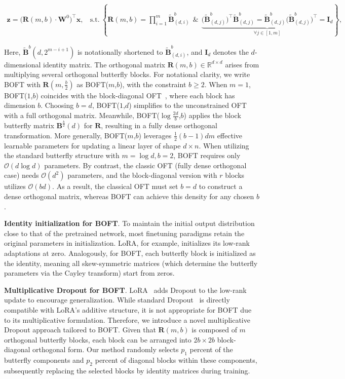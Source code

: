 \begin{equation}
    \begin{aligned}\nonumber
    \bm{z}=\big(\bm{R}(m,b)\cdot\bm{W}^0\big)^\top\bm{x},~~~~\text{s.t.}~\left\{\bm{R}(m,b)=\prod_{i=1}^m \tilde{\bm{B}}^b_{(d,i)}~~\&~~\underbrace{\big(\tilde{\bm{B}}^b_{(d,j)}\big)^\top\tilde{\bm{B}}^b_{(d,j)}=\tilde{\bm{B}}^b_{(d,j)}\big(\tilde{\bm{B}}^b_{(d,j)}\big)^\top\!=\bm{I}_d}_{\forall j\in [1, m]}\right\},
    \end{aligned}
\end{equation}

Here, $\tilde{\bm{B}}^b(d,2^{m - i+1})$ is notationally shortened to $\tilde{\bm{B}}^b_{(d,i)}$, and $\bm{I}_d$ denotes the $d$-dimensional identity matrix. The orthogonal matrix $\bm{R}(m,b)\in\mathbb{R}^{d\times d}$ arises from multiplying several orthogonal butterfly blocks. For notational clarity, we write BOFT with $\bm{R}(m,\frac{b}{2})$ as BOFT($m$,$b$), with the constraint $b\geq 2$. When $m=1$, BOFT($1$,$b$) coincides with the block-diagonal OFT~\cite{qiu2023controlling}, where each block has dimension $b$. Choosing $b=d$, BOFT($1$,$d$) simplifies to the unconstrained OFT~\cite{qiu2023controlling} with a full orthogonal matrix. Meanwhile, BOFT($\log \frac{2d}{b}$,$b$) applies the block butterfly matrix $\bm{B}^{\frac{b}{2}}(d)$ for $\bm{R}$, resulting in a fully dense orthogonal transformation. More generally, BOFT($m$,$b$) leverages $\frac{1}{2}(b-1)dm$ effective learnable parameters for updating a linear layer of shape $d\times n$. When utilizing the standard butterfly structure with $m=\log d, b=2$, BOFT requires only $\mathcal{O}(d\log d)$ parameters. By contrast, the classic OFT (fully dense orthogonal case) needs $\mathcal{O}(d^2)$ parameters, and the block-diagonal version with $r$ blocks utilizes $\mathcal{O}(bd)$. As a result, the classical OFT must set $b=d$ to construct a dense orthogonal matrix, whereas BOFT can achieve this density for any chosen $b$.

\textbf{Identity initialization for BOFT}. To maintain the initial output distribution close to that of the pretrained network, most finetuning paradigms retain the original parameters in initialization. LoRA, for example, initializes its low-rank adaptations at zero. Analogously, for BOFT, each butterfly block is initialized as the identity, meaning all skew-symmetric matrices (which determine the butterfly parameters via the Cayley transform) start from zeros.

\textbf{Multiplicative Dropout for BOFT}. LoRA~\cite{hulora2022} adds Dropout to the low-rank update to encourage generalization. While standard Dropout~\cite{srivastava2014dropout} is directly compatible with LoRA's additive structure, it is not appropriate for BOFT due to its multiplicative formulation. Therefore, we introduce a novel multiplicative Dropout approach tailored to BOFT. Given that $\bm{R}(m,b)$ is composed of $m$ orthogonal butterfly blocks, each block can be arranged into $2b\times 2b$ block-diagonal orthogonal form. Our method randomly selects $p_1$ percent of the butterfly components and $p_2$ percent of diagonal blocks within these components, subsequently replacing the selected blocks by identity matrices during training.

